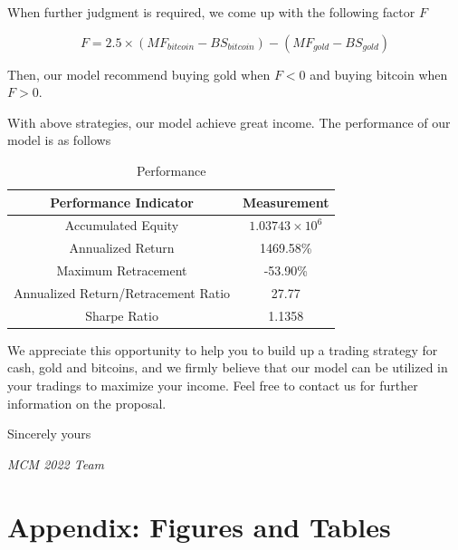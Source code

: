 \documentclass[12pt,a4paper]{article}
\begin{document}
\begin{spacing}{1.2}
\begin{enumerate}
	When further judgment is required, we come up with the following factor $F$ 
	
	$$
	F=2.5 \times (MF_{bitcoin}-BS_{bitcoin})-(MF_{gold}-BS_{gold})
	$$
	
	Then, our model recommend buying gold when $F<0$ and buying bitcoin when $F>0$.
\end{enumerate}

With above strategies, our model achieve great income. The performance of our model is as follows

	\begin{table}[H]
	\renewcommand{\arraystretch}{1.5}
	\caption{Performance}
	\label{table:memo_performance}
	\begin{center}
		{\footnotesize
			\begin{tabular}{c c }
				\toprule
				Performance Indicator & Measurement\\
				\midrule
				Accumulated Equity & $1.03743 \times 10^6$ \\
				Annualized Return & 1469.58\% \\
				Maximum Retracement & -53.90\% \\
				Annualized Return/Retracement Ratio & 27.77 \\
				Sharpe Ratio & 1.1358 \\
				\bottomrule
		\end{tabular}}
	\end{center}	
\end{table}


We appreciate this opportunity to help you to build up a trading strategy for cash, gold and bitcoins, and we firmly believe that our model can be utilized in your tradings to maximize your income. Feel free to contact us for further information on the proposal.

Sincerely yours

\textit{MCM 2022 Team}



\end{spacing}


\newpage
\appendix
\addtocounter{page}{-1}
\thispagestyle{empty}

\section*{Appendix: Figures and Tables}
\label{sec:AppendixFT}
\end{document}
